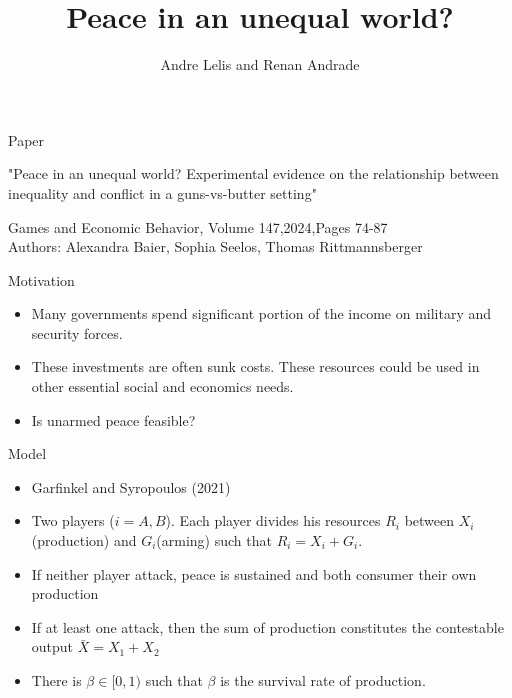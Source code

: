 \documentclass[11pt]{beamer}
\author{Andre Lelis and Renan Andrade}
\title{Peace in an unequal world?}
\begin{document}
\begin{frame}
\titlepage
\end{frame}


\begin{frame}{Paper}

"Peace in an unequal world? Experimental evidence on the relationship between inequality and conflict in a guns-vs-butter setting"

Games and Economic Behavior,
Volume 147,2024,Pages 74-87\\

Authors: Alexandra Baier, Sophia Seelos, Thomas Rittmannsberger
\end{frame}

\begin{frame}{Motivation}

\begin{itemize}
\item Many governments spend significant portion of the income on military and security forces.
\item These investments are often sunk costs. These resources could be used in other essential social and economics needs.
\item Is unarmed peace feasible?
\end{itemize}

\end{frame}

\begin{frame}{Model}

\begin{itemize}
\item Garfinkel and Syropoulos (2021)

\item Two players ($i= A,B$). Each player divides his resources $R_{i}$ between $X_{i}$(production) and $G_{i}$(arming) such that  $R_{i} = X_{i} + G_{i}$. 

\item If neither player attack, peace is sustained and both consumer their own production

\item If at least one attack, then the sum of production constitutes the contestable output $\bar{X} = X_{1} + X_{2}$

\item There is $\beta \in [0,1)$ such that $\beta$ is the survival rate of production.
\end{itemize}

\end{frame}
\end{document}
